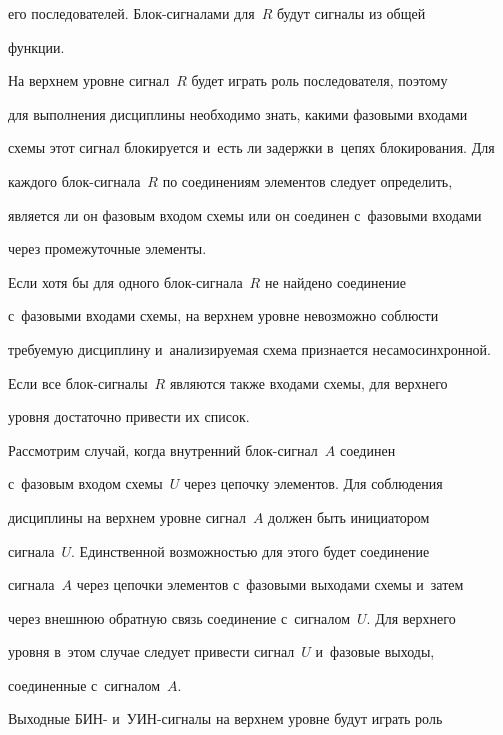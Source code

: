 его последователей. Блок-сигналами для~$R$ будут сигналы из общей 


функции.


   


   На верхнем уровне сигнал~$R$ будет играть роль последователя, поэтому 


для выполнения дисциплины необходимо знать, какими фазовыми входами 


схемы этот сигнал блокируется и~есть ли задержки в~цепях блокирования. Для 


каждого блок-сигнала~$R$ по соединениям элементов следует определить, 


является ли он фазовым входом схемы или он соединен с~фазовыми входами 


через промежуточные элементы.


   


   Если хотя бы для одного блок-сигнала~$R$ не найдено соединение 


с~фазовыми входами схемы, на верхнем уровне невозможно соблюсти 


требуемую дисциплину и~анализируемая схема признается несамосинхронной.


   


   Если все блок-сигналы~$R$ являются также входами схемы, для верхнего 


уровня достаточно привести их список.


   


   Рассмотрим случай, когда внутренний блок-сигнал~$A$ соединен 


с~фазовым входом схемы~$U$ через цепочку элементов. Для соблюдения 


дисциплины на верхнем уровне сигнал~$A$ должен быть инициатором 


сигнала~$U$. Единственной возможностью для этого будет соединение 


сигнала~$A$ через цепочки элементов с~фазовыми выходами схемы и~затем 


через внешнюю обратную связь соединение с~сигналом~$U$. Для верхнего 


уровня в~этом случае следует привести сигнал~$U$ и~фазовые выходы, 


соединенные с~сигналом~$A$.


   


   Выходные БИН- и~УИН-сигналы на верхнем уровне будут играть роль 


